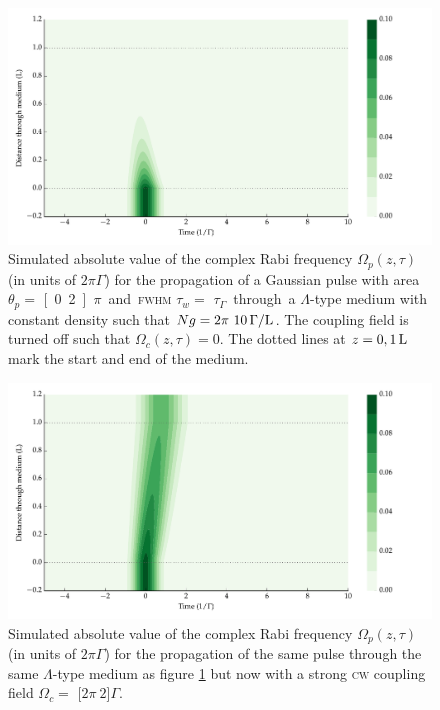     \begin{figure}[p]
      \includegraphics[width=\linewidth]
        {figs/04_polaritons/pls_p0_2pi_t1_Ng1e1_c0_fig1.pdf}
      \caption{
      Simulated absolute value of the complex Rabi frequency $\Omega_p(z, \tau)$
      (in units of $2\pi \Gamma$) for the propagation of a Gaussian pulse with
      area $\theta_p = $ \unit[0.2]{$\pi$} and \textsc{fwhm} $\tau_w = $
      \unit[1]{$\tau_\Gamma$} through a $\Lambda$-type medium with constant
      density such that $Ng = \unit[2\pi~10]{\Gamma/L}$. The coupling field is
      turned off such that $\Omega_c(z, \tau) = 0$. The dotted lines at $z =
      \unit[0, 1]{L}$ mark the start and end of the medium.
      }
      \label{fig:eit_no_coupling}
    \end{figure}

    \begin{figure}[p]
      \includegraphics[width=\linewidth]
        {figs/04_polaritons/pls_p0_2pi_t1_Ng1e1_c02_fig1.pdf}
      \caption{
      Simulated absolute value of the complex Rabi frequency $\Omega_p(z, \tau)$
      (in units of $2\pi \Gamma$) for the propagation of the same pulse through
      the same $\Lambda$-type medium as figure \ref{fig:eit_no_coupling} but now
      with a strong \textsc{cw} coupling field $\Omega_c = $
      \unit[$2\pi~2$]{$\Gamma$}.
      }
      \label{fig:eit_coupling}
    \end{figure}


